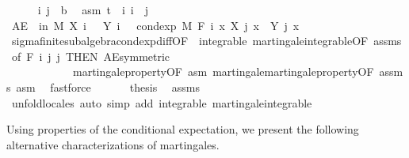 \begin{isabellebody}
\ \ \ \ \isamarkupfalse%
\ i\ j\ {\isacharcolon}{\kern0pt}{\isacharcolon}{\kern0pt}\ {\isacharprime}{\kern0pt}b\ \isamarkupfalse%
\ asm{\isacharcolon}{\kern0pt}\ {\isachardoublequoteopen}t\ {\isasymle}\ i{\isachardoublequoteclose}\ {\isachardoublequoteopen}i\ {\isasymle}\ j{\isachardoublequoteclose}\isanewline
\ \ \ \ \isamarkupfalse%
\ {\isachardoublequoteopen}AE\ {\isasymxi}\ in\ M{\isachardot}{\kern0pt}\ X\ i\ {\isasymxi}\ {\isacharminus}{\kern0pt}\ Y\ i\ {\isasymxi}\ {\isacharequal}{\kern0pt}\ cond{\isacharunderscore}{\kern0pt}exp\ M\ {\isacharparenleft}{\kern0pt}F\ i{\isacharparenright}{\kern0pt}\ {\isacharparenleft}{\kern0pt}{\isasymlambda}x{\isachardot}{\kern0pt}\ X\ j\ x\ {\isacharminus}{\kern0pt}\ Y\ j\ x{\isacharparenright}{\kern0pt}\ {\isasymxi}{\isachardoublequoteclose}\ \isanewline
\ \ \ \ \ \ \isamarkupfalse%
\ sigma{\isacharunderscore}{\kern0pt}finite{\isacharunderscore}{\kern0pt}subalgebra{\isachardot}{\kern0pt}cond{\isacharunderscore}{\kern0pt}exp{\isacharunderscore}{\kern0pt}diff{\isacharbrackleft}{\kern0pt}OF\ {\isacharunderscore}{\kern0pt}\ integrable\ martingale{\isachardot}{\kern0pt}integrable{\isacharbrackleft}{\kern0pt}OF\ assms{\isacharbrackright}{\kern0pt}{\isacharcomma}{\kern0pt}\ of\ {\isachardoublequoteopen}F\ i{\isachardoublequoteclose}\ j\ j{\isacharcomma}{\kern0pt}\ THEN\ AE{\isacharunderscore}{\kern0pt}symmetric{\isacharbrackright}{\kern0pt}\ \isanewline
\ \ \ \ \ \ \ \ \ \ \ \ martingale{\isacharunderscore}{\kern0pt}property{\isacharbrackleft}{\kern0pt}OF\ asm{\isacharbrackright}{\kern0pt}\ martingale{\isachardot}{\kern0pt}martingale{\isacharunderscore}{\kern0pt}property{\isacharbrackleft}{\kern0pt}OF\ assms\ asm{\isacharbrackright}{\kern0pt}\ \isamarkupfalse%
\ fastforce\isanewline
\ \ \isacommand{{\isacharbraceright}{\kern0pt}}\isamarkupfalse%
\isanewline
\ \ \isamarkupfalse%
\ {\isacharquery}{\kern0pt}thesis\ \isamarkupfalse%
\ assms\ \isamarkupfalse%
\ {\isacharparenleft}{\kern0pt}unfold{\isacharunderscore}{\kern0pt}locales{\isacharparenright}{\kern0pt}\ {\isacharparenleft}{\kern0pt}auto\ simp\ add{\isacharcolon}{\kern0pt}\ integrable\ martingale{\isachardot}{\kern0pt}integrable{\isacharparenright}{\kern0pt}\ \ \isanewline
{}\isamarkupfalse%
%
\endisatagproof
{\isafoldproof}%
%
\isadelimproof
\isanewline
%
\endisadelimproof
\isanewline
{}\isamarkupfalse%
%
\begin{isamarkuptext}%
Using properties of the conditional expectation, we present the following alternative characterizations of martingales.%

\end{isamarkuptext}
\end{isabellebody}
